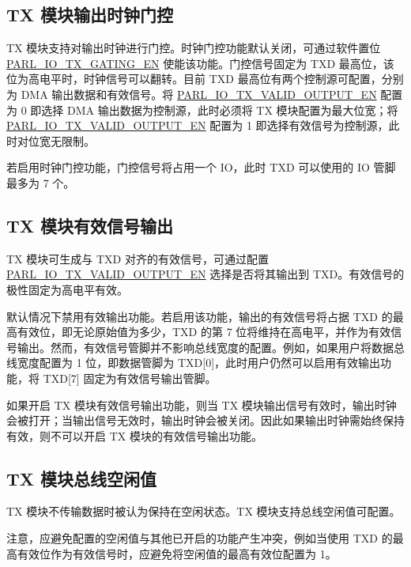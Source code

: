 \documentclass[main\_\_CN.tex]{subfiles}
\begin{document}
{
\subsection{TX 模块输出时钟门控}

TX 模块支持对输出时钟进行门控。时钟门控功能默认关闭，可通过软件置位 \hyperref[fielddesc:PARLIOTXGATINGEN]{PARL\_IO\_TX\_GATING\_EN} 使能该功能。门控信号固定为 TXD 最高位，该位为高电平时，时钟信号可以翻转。目前 TXD 最高位有两个控制源可配置，分别为 DMA 输出数据和有效信号。将 \hyperref[fielddesc:PARLIOTXVALIDOUTPUTEN]{PARL\_IO\_TX\_VALID\_OUTPUT\_EN} 配置为 0 即选择 DMA 输出数据为控制源，此时必须将 TX 模块配置为最大位宽；将 \hyperref[fielddesc:PARLIOTXVALIDOUTPUTEN]{PARL\_IO\_TX\_VALID\_OUTPUT\_EN} 配置为 1 即选择有效信号为控制源，此时对位宽无限制。

若启用时钟门控功能，门控信号将占用一个 IO，此时 TXD 可以使用的 IO 管脚最多为 7 个。

\subsection{TX 模块有效信号输出}

TX 模块可生成与 TXD 对齐的有效信号，可通过配置 \hyperref[fielddesc:PARLIOTXVALIDOUTPUTEN]{PARL\_IO\_TX\_VALID\_OUTPUT\_EN} 选择是否将其输出到 TXD。有效信号的极性固定为高电平有效。

默认情况下禁用有效输出功能。若启用该功能，输出的有效信号将占据 TXD 的最高有效位，即无论原始值为多少，TXD 的第 7 位将维持在高电平，并作为有效信号输出。然而，有效信号管脚并不影响总线宽度的配置。例如，如果用户将数据总线宽度配置为 1 位，即数据管脚为 TXD[0]，此时用户仍然可以启用有效输出功能，将 TXD[7] 固定为有效信号输出管脚。

\begin{tiplisting}
如果开启 TX 模块有效信号输出功能，则当 TX 模块输出信号有效时，输出时钟会被打开；当输出信号无效时，输出时钟会被关闭。因此如果输出时钟需始终保持有效，则不可以开启 TX 模块的有效信号输出功能。
\end{tiplisting}
}

\subsection{TX 模块总线空闲值}\label{subsec:parlio-tx-bus-idle-value}

TX 模块不传输数据时被认为保持在空闲状态。TX 模块支持总线空闲值可配置。

注意，应避免配置的空闲值与其他已开启的功能产生冲突，例如当使用 TXD 的最高有效位作为有效信号时，应避免将空闲值的最高有效位配置为 1。
\end{document}
